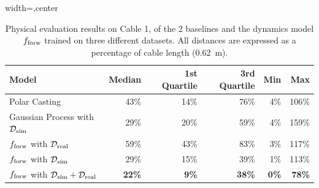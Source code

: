 \documentclass[letterpaper, 10 pt, conference]{ieeeconf}  %
\begin{document}

\begin{table}[t]
  \setlength\tabcolsep{5.0pt}
  \vspace{1pt}
  \centering
  \caption{
    Physical evaluation results on Cable 1, of the 2 baselines and the dynamics model $f_{\rm forw}$ trained on three different datasets. All distances are expressed as a percentage of cable length (\SI{0.62}{\meter}).
  }
  \begin{adjustbox}{width=\columnwidth,center}
    \centering
  \small
  \begin{tabular}{@{}lrrrrr}
  \toprule
  Model & Median & 1st Quartile & 3rd Quartile & Min & Max \\
  \midrule
Polar Casting & 43\%  & 14\%   & 76\% & 4\% & 106\%  \\
Gaussian Process with $\mathcal{D}_{\rm sim}$ & 29\% & 20\% & 59\% & 4\% & 159\% \\
$f_{\rm forw}$ with $\mathcal{D}_{\rm real}$ & 59\% & 43\% & 83\% & 3\% & 117\%  \\
$f_{\rm forw}$ with $\mathcal{D}_{\rm sim}$ & 29\% & 15\% & 39\% & 1\%& 113\%\\
$f_{\rm forw}$ with $\mathcal{D}_{\rm sim} + \mathcal{D}_{\rm real}$ & \textbf{22\%} &\textbf{ 9\%} & \textbf{38\%} & \textbf{0\%} & \textbf{78\% } \\
  \toprule
  \end{tabular}
  \end{adjustbox}
  \label{tab:error}
\vspace*{-5pt}
\end{table}  
\end{document}
